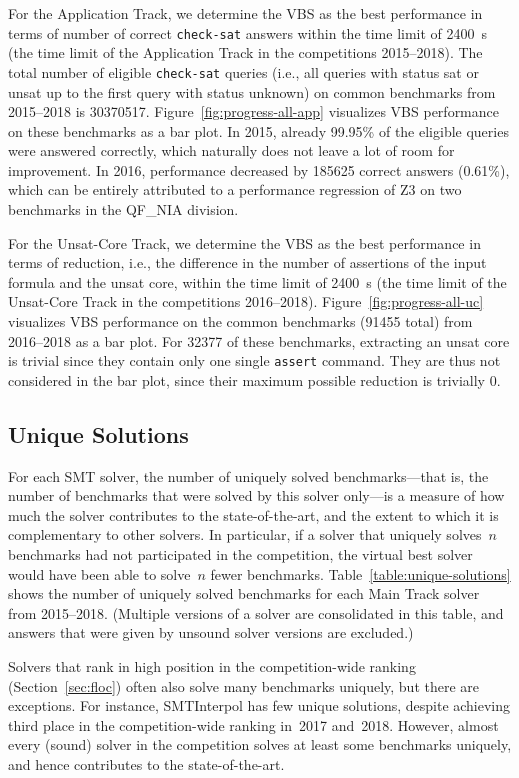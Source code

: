\documentclass[dvipsnames,table,twoside,11pt]{article}
\newcommand{\maintrack}{Main Track\xspace}
\newcommand{\apptrack}{Application Track\xspace}
\newcommand{\ucoretrack}{Unsat-Core Track\xspace}
\begin{document}
For the \apptrack, we determine the VBS as the best performance
in terms of number of correct \texttt{check-sat} answers within the time limit
of \SI{2400}{s} (the time limit of the \apptrack in the competitions
2015--2018).
The total number of eligible \texttt{check-sat} queries (i.e., all queries with
status sat or unsat up to the first query with status unknown) on
common benchmarks from 2015--2018 is \num{30370517}.
Figure~\ref{fig:progress-all-app} visualizes VBS performance on these
benchmarks as a bar plot.
In 2015, already 99.95\% of the eligible queries were answered correctly,
which naturally does not leave a lot of room for improvement.
In 2016, performance decreased by \num{185625} correct answers (0.61\%),
which can be entirely attributed to a performance regression
of Z3 on two benchmarks in the QF\_NIA division.

For the \ucoretrack, we determine the VBS as the best performance in
terms of reduction, i.e., the difference in the number of assertions
of the input formula and the unsat core, within the time limit
of \SI{2400}{s} (the time limit of the \ucoretrack in the competitions
2016--2018).
Figure~\ref{fig:progress-all-uc} visualizes VBS performance on the common
benchmarks (\num{91455} total) from 2016--2018 as a bar plot.
For \num{32377} of these benchmarks, extracting an unsat core is trivial since
they contain only one single \texttt{assert} command.
They are thus not considered in the bar plot, since their maximum
possible reduction is trivially 0.

\subsection{Unique Solutions}

For each SMT solver, the number of uniquely solved benchmarks---that
is, the number of benchmarks that were solved by this solver only---is
a measure of how much the solver contributes to the state-of-the-art,
and the extent to which it is complementary to other solvers.  In
particular, if a solver that uniquely solves~$n$ benchmarks had not
participated in the competition, the virtual best solver would have
been able to solve~$n$ fewer benchmarks.
Table~\ref{table:unique-solutions} shows the number of uniquely solved
benchmarks for each \maintrack solver from 2015--2018.  (Multiple
versions of a solver are consolidated in this table, and answers that
were given by unsound solver versions are excluded.)

Solvers that rank in high position in the competition-wide ranking
(Section~\ref{sec:floc}) often also solve many benchmarks uniquely,
but there are exceptions.  For instance, SMTInterpol has few unique
solutions, despite achieving third place in the competition-wide
ranking in~2017 and~2018.  However, almost every (sound) solver in the
competition solves at least some benchmarks uniquely, and hence
contributes to the state-of-the-art.
\end{document}
